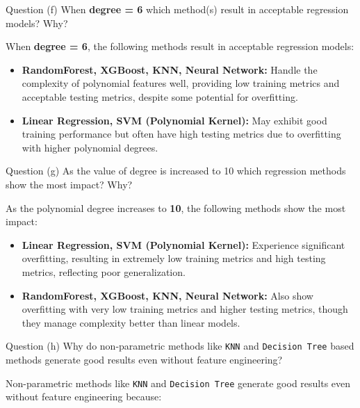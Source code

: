 \begin{customboxnew}[label={box:Q3f}]{Question (f)}
	When \textbf{degree = 6} which method(s) result in acceptable regression models? Why?
\end{customboxnew}

When \textbf{degree = 6}, the following methods result in acceptable regression models:

\begin{itemize}
    \item \textbf{RandomForest, XGBoost, KNN, Neural Network:} Handle the complexity of polynomial features well, providing low training metrics and acceptable testing metrics, despite some potential for overfitting.
    \item \textbf{Linear Regression, SVM (Polynomial Kernel):} May exhibit good training performance but often have high testing metrics due to overfitting with higher polynomial degrees.
\end{itemize}

\begin{customboxnew}[label={box:Q3g}]{Question (g)}
	As the value of degree is increased to 10 which regression methods show the most impact? Why?
\end{customboxnew}

As the polynomial degree increases to \textbf{10}, the following methods show the most impact:

\begin{itemize}
    \item \textbf{Linear Regression, SVM (Polynomial Kernel):} Experience significant overfitting, resulting in extremely low training metrics and high testing metrics, reflecting poor generalization.
    \item \textbf{RandomForest, XGBoost, KNN, Neural Network:} Also show overfitting with very low training metrics and higher testing metrics, though they manage complexity better than linear models.
\end{itemize}

\begin{customboxnew}[label={box:Q3h}]{Question (h)}
	Why do non-parametric methods like \verb|KNN| and \verb|Decision Tree| based methods generate good results even without feature engineering?
\end{customboxnew}

Non-parametric methods like \texttt{KNN} and \texttt{Decision Tree} generate good results even without feature engineering because:

